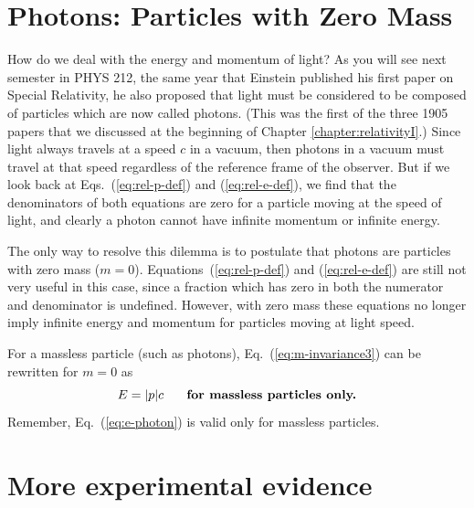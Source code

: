 \section{Photons: Particles with Zero Mass}

How do we deal with the energy and momentum of light? As you will see
next semester in PHYS 212, the same year that Einstein published his
first paper on Special Relativity, he also proposed that light must be
considered to be composed of particles which are now called photons.
(This was the first of the three 1905 papers that we discussed at the
beginning of Chapter \ref{chapter:relativityI}.)  Since light always travels
at a speed $c$ in a vacuum, then photons in a vacuum must travel at
that speed regardless of the reference frame of the observer.  But if
we look back at Eqs.~(\ref{eq:rel-p-def}) and (\ref{eq:rel-e-def}), we
find that the denominators of both equations are zero for a particle
moving at the speed of light, and clearly a photon cannot have
infinite momentum or infinite energy.

    
The only way to resolve this dilemma is to postulate that photons are
particles with zero mass ($m = 0$).  Equations~(\ref{eq:rel-p-def})
and (\ref{eq:rel-e-def}) are still not very useful in this case, since a
fraction which has zero in both the numerator and denominator is
undefined.  However, with zero mass these equations no longer imply 
infinite energy and momentum for particles moving at light speed.
    
For a massless particle (such as photons),
Eq.~(\ref{eq:m-invariance3}) can be rewritten for $m=0$ as
\begin{equation}
E = \vert p\vert c\text{\hspace{0.25in}{\bf for massless particles only.}}
\label{eq:e-photon}
\end{equation}
Remember, Eq.~(\ref{eq:e-photon}) is valid only for massless
particles.

\section{More experimental evidence}

